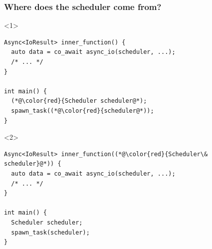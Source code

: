 \documentclass[aspectratio=169]{beamer}
\begin{document}
\begin{frame}[fragile]
  \frametitle{Where does the scheduler come from?}

  \begin{onlyenv}<1>
  \begin{lstlisting}[style=cpp20]
Async<IoResult> inner_function() {
  auto data = co_await async_io(scheduler, ...);
  /* ... */
}

int main() {
  (*@\color{red}{Scheduler scheduler@*);
  spawn_task((*@\color{red}{scheduler@*));
}
  \end{lstlisting}
  \end{onlyenv}
  \begin{onlyenv}<2>
  \begin{lstlisting}[style=cpp20]
Async<IoResult> inner_function((*@\color{red}{Scheduler\& scheduler}@*)) {
  auto data = co_await async_io(scheduler, ...);
  /* ... */
}

int main() {
  Scheduler scheduler;
  spawn_task(scheduler);
}
  \end{lstlisting}
  \end{onlyenv}
  
  
\end{frame}
\end{document}
